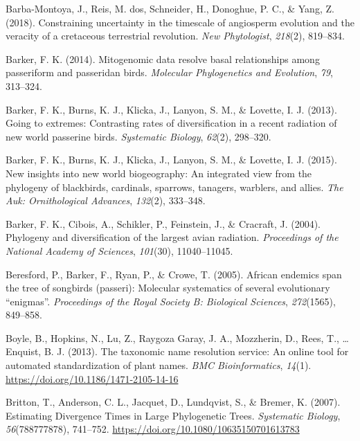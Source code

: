 \documentclass[english,man]{apa6}
\begin{document}
\leavevmode\hypertarget{ref-barba2018constraining}{}%
Barba-Montoya, J., Reis, M. dos, Schneider, H., Donoghue, P. C., \& Yang, Z. (2018). Constraining uncertainty in the timescale of angiosperm evolution and the veracity of a cretaceous terrestrial revolution. \emph{New Phytologist}, \emph{218}(2), 819--834.

\leavevmode\hypertarget{ref-barker2014mitogenomic}{}%
Barker, F. K. (2014). Mitogenomic data resolve basal relationships among passeriform and passeridan birds. \emph{Molecular Phylogenetics and Evolution}, \emph{79}, 313--324.

\leavevmode\hypertarget{ref-barker2013going}{}%
Barker, F. K., Burns, K. J., Klicka, J., Lanyon, S. M., \& Lovette, I. J. (2013). Going to extremes: Contrasting rates of diversification in a recent radiation of new world passerine birds. \emph{Systematic Biology}, \emph{62}(2), 298--320.

\leavevmode\hypertarget{ref-barker2015new}{}%
Barker, F. K., Burns, K. J., Klicka, J., Lanyon, S. M., \& Lovette, I. J. (2015). New insights into new world biogeography: An integrated view from the phylogeny of blackbirds, cardinals, sparrows, tanagers, warblers, and allies. \emph{The Auk: Ornithological Advances}, \emph{132}(2), 333--348.

\leavevmode\hypertarget{ref-barker2004phylogeny}{}%
Barker, F. K., Cibois, A., Schikler, P., Feinstein, J., \& Cracraft, J. (2004). Phylogeny and diversification of the largest avian radiation. \emph{Proceedings of the National Academy of Sciences}, \emph{101}(30), 11040--11045.

\leavevmode\hypertarget{ref-beresford2005african}{}%
Beresford, P., Barker, F., Ryan, P., \& Crowe, T. (2005). African endemics span the tree of songbirds (passeri): Molecular systematics of several evolutionary ``enigmas''. \emph{Proceedings of the Royal Society B: Biological Sciences}, \emph{272}(1565), 849--858.

\leavevmode\hypertarget{ref-Boyle2013}{}%
Boyle, B., Hopkins, N., Lu, Z., Raygoza Garay, J. A., Mozzherin, D., Rees, T., \ldots{} Enquist, B. J. (2013). The taxonomic name resolution service: An online tool for automated standardization of plant names. \emph{BMC Bioinformatics}, \emph{14}(1). \url{https://doi.org/10.1186/1471-2105-14-16}

\leavevmode\hypertarget{ref-Britton2007}{}%
Britton, T., Anderson, C. L., Jacquet, D., Lundqvist, S., \& Bremer, K. (2007). Estimating Divergence Times in Large Phylogenetic Trees. \emph{Systematic Biology}, \emph{56}(788777878), 741--752. \url{https://doi.org/10.1080/10635150701613783}
\end{document}
